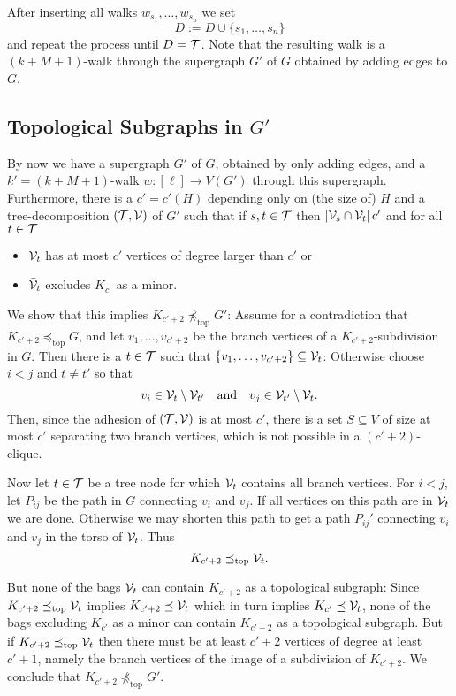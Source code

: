 \documentclass[12pt]{amsart}
\newcommand{\absval}[1]{\left\vert #1 \right\vert}
\newcommand{\topmin}{\preceq_{\mathrm{top}}}
\begin{document}
After inserting all walks $w_{s_1},\ldots,w_{s_n}$ we set
\[
D := D \cup \{ s_1,\ldots,s_n \}
\]
and repeat the process until $D = \mathcal{T}$. Note that the resulting walk
is a $(k + M + 1)$-walk through the supergraph $G'$ of $G$ obtained by
adding edges to $G$.

\subsection{Topological Subgraphs in $G'$}

By now we have a supergraph $G'$ of $G$, obtained by only adding
edges, and a $k' = (k+M+1)$-walk $w : [\ell] \to V(G')$ through this
supergraph. Furthermore, there is a $c' = c'(H)$ depending only on
(the size of) $H$ and a tree-decomposition $(\mathcal{T},\mathcal{V})$ of $G'$ such
that if $s,t \in \mathcal{T}$ then $\absval{\VVV_s \cap \VVV_t} c'$ and for
all $t \in \mathcal{T}$
\begin{itemize}
\item ${\bar{\mathcal{V}}}_t$ has at most $c'$ vertices of degree larger
  than $c'$ or
\item ${\bar{\mathcal{V}}}_t$ excludes $K_{c'}$ as a minor.
\end{itemize}

We show that this implies $K_{c'+2} \not \topmin G'$: Assume for a
contradiction that $K_{c'+2} \topmin G$, and let $v_1,\ldots,v_{c'+2}$
be the branch vertices of a $K_{c'+2}$-subdivision in $G$. Then there
is a $t \in \mathcal{T}$ such that $\{ v_1,\ldots,v_{c'+2} \} \subseteq
\mathcal{V}_t$: Otherwise choose $i < j$ and $t \not = t'$ so that
\[
v_i \in \mathcal{V}_t \setminus \mathcal{V}_{t'}
\quad\text{and}\quad
v_j \in \mathcal{V}_{t'} \setminus \mathcal{V}_t.
\]
Then, since the adhesion of $(\mathcal{T},\mathcal{V})$ is at most $c'$, there is a
set $S \subseteq V$ of size at most $c'$ separating two branch
vertices, which is not possible in a $(c'+2)$-clique.

Now let $t \in \mathcal{T}$ be a tree node for which $\mathcal{V}_t$ contains all
branch vertices. For $i < j$, let $P_{ij}$ be the path in $G$
connecting $v_i$ and $v_j$. If all vertices on this path are in
$\mathcal{V}_t$ we are done. Otherwise we may shorten this path to get a path
$P_{ij}'$ connecting $v_i$ and $v_j$ in the torso of $\mathcal{V}_t$. Thus
\[
K_{c'+2} \topmin \VVV_t.
\]

But none of the bags $\mathcal{V}_t$ can contain $K_{c'+2}$ as a topological
subgraph: Since $K_{c'+2} \topmin \VVV_t$ implies $K_{c'+2} \preceq
\mathcal{V}_t$ which in turn implies $K_{c'} \preceq \mathcal{V}_t$, none of the
bags excluding $K_{c'}$ as a minor can contain $K_{c'+2}$ as a
topological subgraph. But if $K_{c'+2} \topmin \VVV_t$ then there must
be at least $c'+2$ vertices of degree at least $c'+1$, namely the
branch vertices of the image of a subdivision of $K_{c'+2}$. We
conclude that $K_{c'+2} \not\topmin G'$.
\end{document}
